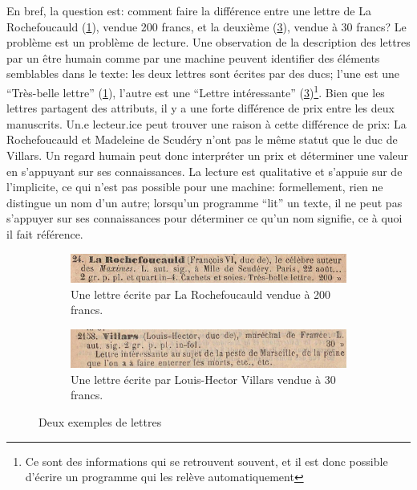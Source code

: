 En bref, la question est: comment faire la différence entre une lettre de La Rochefoucauld (\ref{fig:rochefoucauld}), vendue 200 francs, et la deuxième (\ref{fig:villars}), vendue à 30 francs? Le problème est un problème de lecture. Une observation de la description des lettres par un être humain comme par une machine peuvent identifier des éléments semblables dans le texte: les deux lettres sont écrites par des ducs; l'une est une \enquote{Très-belle lettre} (\ref{fig:rochefoucauld}), l'autre est une \enquote{Lettre intéressante} (\ref{fig:villars})\footnote{Ce sont des informations qui se retrouvent souvent, et il est donc possible d'écrire un programme qui les relève automatiquement}. Bien que les lettres partagent des attributs, il y a une forte différence de prix entre les deux manuscrits. Un.e lecteur.ice peut trouver une raison à cette différence de prix: La Rochefoucauld et Madeleine de Scudéry n'ont pas le même statut que le duc de Villars. Un regard humain peut donc interpréter un prix et déterminer une valeur en s'appuyant sur ses connaissances. La lecture est qualitative et s'appuie sur de l'implicite, ce qui n'est pas possible pour une machine: formellement, rien ne distingue un nom d'un autre; lorsqu'un programme \enquote{lit} un texte, il ne peut pas s'appuyer sur ses connaissances pour déterminer ce qu'un nom signifie, ce à quoi il fait référence.

\begin{figure}[h!]
	\centering
	\begin{subfigure}{0.8\textwidth}
		\includegraphics[width=\textwidth]{img/cat_000372_e24.png}
		\caption{Une lettre écrite par La Rochefoucauld vendue à 200 francs.}
		\label{fig:rochefoucauld}
	\end{subfigure}
	\begin{subfigure}{0.8\textwidth}
		\includegraphics[width=\textwidth]{img/cat_000382_e2158.png}
		\caption{Une lettre écrite par Louis-Hector Villars vendue à 30 francs.}
		\label{fig:villars}
	\end{subfigure}
	\caption{Deux exemples de lettres}
\end{figure}

